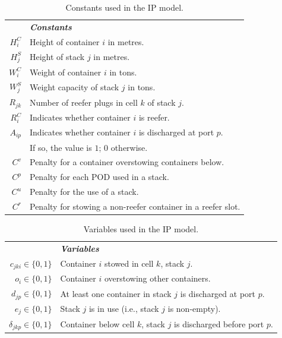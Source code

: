 \documentclass[preprint,11pt,3p]{elsarticle}
\begin{document}
\begin{table}[!ht]
\begin{center}
\begin{tabular}{rl}
    & \textbf{\textit{Constants}}\\
    $H^{C}_{i}$& Height of container $i$ in metres.\\
    $H^{S}_{j}$& Height of stack $j$ in metres.\\
    $W^{C}_{i}$& Weight of container $i$ in tons.\\
    $W^{S}_{j}$& Weight capacity of stack $j$ in tons.\\
    $R_{jk}$& Number of reefer plugs in cell $k$ of stack $j$.\\
    $R^{C}_{i}$& Indicates whether container $i$ is reefer.\\
    $A_{ip}$& Indicates whether container $i$ is discharged at port $p$.\\
    & If so, the value is $1$; $0$ otherwise.\\
    $C^v$& Penalty for a container overstowing containers below.\\
    $C^p$& Penalty for each POD used in a stack.\\
    $C^u$& Penalty for the use of a stack.\\
    $C^r$& Penalty for stowing a non-reefer container in a reefer slot.
\end{tabular}
\end{center}
\caption{Constants used in the IP model.}
\label{tab:IPConstants}
\end{table}

\begin{table} [!ht]
\begin{center}
\begin{tabular}{rl}
    & \textbf{\textit{Variables}}\\
    $c_{jki} \in \{0, 1\}$& Container $i$ stowed in cell $k$, stack $j$.\\
    $o_{i} \in \{0, 1\}$& Container $i$ overstowing other containers.\\
    $d_{jp} \in \{0, 1\}$& At least one container in stack $j$ is discharged at port $p$.\\
    $e_{j} \in \{0, 1\}$& Stack $j$ is in use (i.e., stack $j$ is non-empty).\\
    $\delta_{jkp} \in \{0, 1\}$& Container below cell $k$, stack $j$ is discharged before port $p$.
\end{tabular}
\end{center}
\caption{Variables used in the IP model.}
\label{tab:IPVars}
\end{table}
\end{document}

